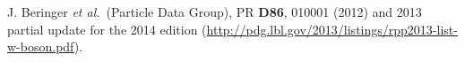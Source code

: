 \documentclass[10pt,a4paper]{article}
\newcommand{\etal}{\emph{et al.}}
\begin{document}
\begin{thebibliography}{1}
 J. Beringer \etal\ (Particle Data Group), PR \textbf{D86}, 010001 (2012) and 2013 partial update for the 2014 edition
(\url{http://pdg.lbl.gov/2013/listings/rpp2013-list-w-boson.pdf}).

%

\end{thebibliography}




%



%
%
%
%



%
%
%
%
%
\end{document}
